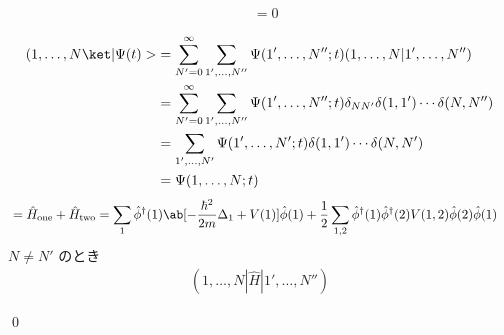 \documentclass[uplatex,dvipdfmx,a4paper,11pt]{jlreq}
\makeatletter
\numberwithin{equation}{section}
\theoremstyle{definition}
\renewenvironment{proof}[1][\proofname]{\par
  \normalfont
  \topsep6\p@\@plus6\p@ \trivlist
  \item[\hskip\labelsep{\bfseries #1}\@addpunct{\bfseries}]\ignorespaces\quad\par
}{
  \qed\endtrivlist\@endpefalse
}
\renewcommand\proofname{証明}
\makeatother
\begin{document}
\begin{theorem}[Q21-94(i)(ii)(iii)(iv)(v)]
  \begin{align}
    [\hat{H}, \hat{N}] & = 0
  \end{align}
\end{theorem}
\begin{proof}
  \begin{align}
    (1,\ldots,N\ket|\Psi(t)> & = \sum_{N' = 0}^{\infty}\sum_{1',\ldots,N''}\Psi(1',\ldots,N''; t)(1,\ldots,N|1',\ldots,N'')                    \\
                             & = \sum_{N' = 0}^{\infty}\sum_{1',\ldots,N''}\Psi(1',\ldots,N''; t)\delta_{NN'}\delta(1, 1')\cdots\delta(N, N'') \\
                             & = \sum_{1',\ldots,N'}\Psi(1',\ldots,N'; t)\delta(1, 1')\cdots\delta(N, N')                                      \\
                             & = \Psi(1,\ldots,N; t)
  \end{align}
  \begin{align}
    [\hat{H}, \hat{N}] & = \hat{H}_{\mathrm{one}} + \hat{H}_{\mathrm{two}} = \sum_{1}\hat{\phi}^\dagger(1)\ab[-\frac{\hbar^2}{2m}\Delta_{1} + V(1)]\hat{\phi}(1) + \frac{1}{2}\sum_{1,2}\hat{\phi}^\dagger(1)\hat{\phi}^\dagger(2)V(1, 2)\hat{\phi}(2)\hat{\phi}(1)
  \end{align}
  $N \neq N'$ のとき
  \begin{align}
    (1,\ldots,N|\hat{H}|1',\ldots,N'')
  \end{align}
\end{proof}
\end{document}
